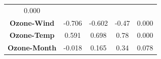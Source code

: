 \documentclass[]{article}
\theoremstyle{definition}
\theoremstyle{definition}
\theoremstyle{definition}
\theoremstyle{remark}
\begin{document}
\begin{longtable}[]{@{}ccccc@{}}
\begin{minipage}[t]{0.10\columnwidth}
0.000\strut
\end{minipage}\tabularnewline
\begin{minipage}[t]{0.21\columnwidth}\centering\strut
\textbf{Ozone-Wind}\strut
\end{minipage} & \begin{minipage}[t]{0.11\columnwidth}\centering\strut
-0.706\strut
\end{minipage} & \begin{minipage}[t]{0.11\columnwidth}\centering\strut
-0.602\strut
\end{minipage} & \begin{minipage}[t]{0.10\columnwidth}\centering\strut
-0.47\strut
\end{minipage} & \begin{minipage}[t]{0.10\columnwidth}\centering\strut
0.000\strut
\end{minipage}\tabularnewline
\begin{minipage}[t]{0.21\columnwidth}\centering\strut
\textbf{Ozone-Temp}\strut
\end{minipage} & \begin{minipage}[t]{0.11\columnwidth}\centering\strut
0.591\strut
\end{minipage} & \begin{minipage}[t]{0.11\columnwidth}\centering\strut
0.698\strut
\end{minipage} & \begin{minipage}[t]{0.10\columnwidth}\centering\strut
0.78\strut
\end{minipage} & \begin{minipage}[t]{0.10\columnwidth}\centering\strut
0.000\strut
\end{minipage}\tabularnewline
\begin{minipage}[t]{0.21\columnwidth}\centering\strut
\textbf{Ozone-Month}\strut
\end{minipage} & \begin{minipage}[t]{0.11\columnwidth}\centering\strut
-0.018\strut
\end{minipage} & \begin{minipage}[t]{0.11\columnwidth}\centering\strut
0.165\strut
\end{minipage} & \begin{minipage}[t]{0.10\columnwidth}\centering\strut
0.34\strut
\end{minipage} & \begin{minipage}[t]{0.10\columnwidth}\centering\strut
0.078\strut
\end{minipage}\tabularnewline

\end{longtable}
\end{document}
